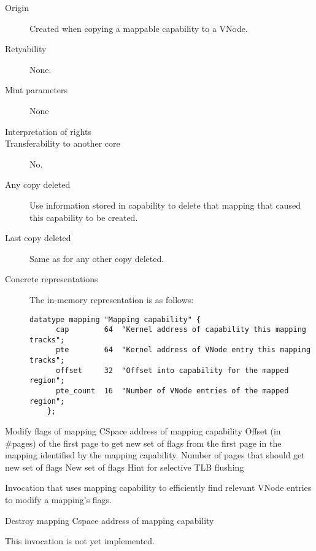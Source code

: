 \begin{description}
\item[Origin] Created when copying a mappable capability to a VNode.
  
\item[Retyability] None.
  
\item[Mint parameters] None
  
\item[Interpretation of rights] 
  
\item[Transferability to another core] No.

\item[Any copy deleted] Use information stored in capability to delete that
  mapping that caused this capability to be created.

\item[Last copy deleted] Same as for any other copy deleted.
  
\item[Concrete representations] The in-memory representation is as follows:
  
  \begin{lstlisting}[language=Mackerel]
    datatype mapping "Mapping capability" {
      cap        64  "Kernel address of capability this mapping tracks";
      pte        64  "Kernel address of VNode entry this mapping tracks";
      offset     32  "Offset into capability for the mapped region";
      pte_count  16  "Number of VNode entries of the mapped region";
    };
  \end{lstlisting}
\end{description}

\begin{invocation}{Modify flags of mapping}
 \arg CSpace address of mapping capability
 \arg Offset (in #pages) of the first page to get new set of flags from the
  first page in the mapping identified by the mapping capability.
 \arg Number of pages that should get new set of flags
 \arg New set of flags
 \arg Hint for selective TLB flushing
\end{invocation}
Invocation that uses mapping capability to efficiently find relevant VNode
entries to modify a mapping's flags.

\begin{invocation}{Destroy mapping}
  \arg Cspace address of mapping capability
\end{invocation}
This invocation is not yet implemented.

